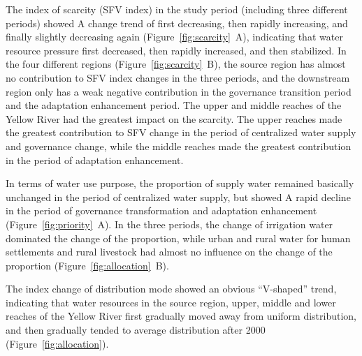 \documentclass[draft,wrr]{../agutexSI2019}
\begin{document}
\begin{article}
The index of scarcity (SFV index) in the study period (including three different periods) showed A change trend of first decreasing, then rapidly increasing, and finally slightly decreasing again (Figure~\ref{fig:scarcity}~A), indicating that water resource pressure first decreased, then rapidly increased, and then stabilized.
In the four different regions (Figure~\ref{fig:scarcity}~B), the source region has almost no contribution to SFV index changes in the three periods, and the downstream region only has a weak negative contribution in the governance transition period and the adaptation enhancement period.
The upper and middle reaches of the Yellow River had the greatest impact on the scarcity. The upper reaches made the greatest contribution to SFV change in the period of centralized water supply and governance change, while the middle reaches made the greatest contribution in the period of adaptation enhancement.


In terms of water use purpose, the proportion of supply water remained basically unchanged in the period of centralized water supply, but showed A rapid decline in the period of governance transformation and adaptation enhancement (Figure~\ref{fig:priority}~A).
In the three periods, the change of irrigation water dominated the change of the proportion, while urban and rural water for human settlements and rural livestock had almost no influence on the change of the proportion (Figure~\ref{fig:allocation}~B).

The index change of distribution mode showed an obvious ``V-shaped'' trend, indicating that water resources in the source region, upper, middle and lower reaches of the Yellow River first gradually moved away from uniform distribution, and then gradually tended to average distribution after 2000 (Figure~\ref{fig:allocation}).



\end{article}
\end{document}

